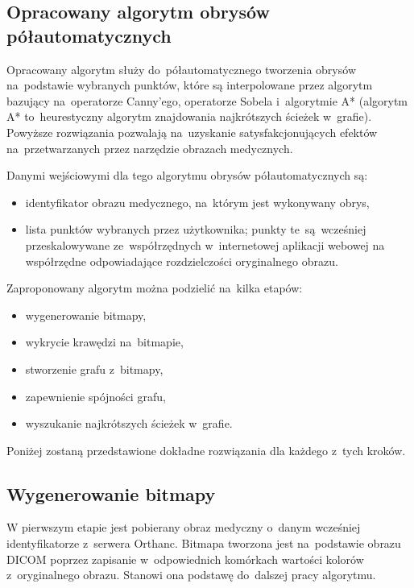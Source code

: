 \documentclass[a4paper,11pt,twoside,openright]{report}
\theoremstyle{definition}
\begin{document}
\subsection {Opracowany algorytm obrysów półautomatycznych}

Opracowany algorytm służy do~półautomatycznego tworzenia obrysów na~podstawie wybranych punktów,
które są interpolowane przez algorytm bazujący na~operatorze Canny'ego, operatorze
Sobela i~algorytmie A* (algorytm A* to~heurestyczny algorytm znajdowania najkrótszych ścieżek w~grafie).
Powyższe rozwiązania pozwalają na~uzyskanie satysfakcjonujących efektów na~przetwarzanych
przez narzędzie obrazach medycznych.

Danymi wejściowymi dla tego algorytmu obrysów półautomatycznych są:
\begin{itemize}[noitemsep]
\item {identyfikator obrazu medycznego, na~którym jest wykonywany obrys,}
\item {lista punktów wybranych przez użytkownika; punkty te~są~wcześniej
przeskalowywane ze~współrzędnych w~internetowej aplikacji webowej
na współrzędne odpowiadające rozdzielczości oryginalnego obrazu.}
\end{itemize}


Zaproponowany algorytm można podzielić na~kilka etapów:

\begin{itemize}[noitemsep]
\item {wygenerowanie bitmapy,}
\item {wykrycie krawędzi na~bitmapie,}
\item {stworzenie grafu z~bitmapy,}
\item {zapewnienie spójności grafu,}
\item {wyszukanie najkrótszych ścieżek w~grafie.}
\end{itemize}

Poniżej zostaną przedstawione dokładne rozwiązania dla każdego z~tych kroków.

\subsection {Wygenerowanie bitmapy}

W pierwszym etapie jest pobierany obraz medyczny o~danym wcześniej
identyfikatorze z~serwera Orthanc. Bitmapa tworzona jest na~podstawie obrazu DICOM poprzez
zapisanie w~odpowiednich komórkach wartości kolorów z~oryginalnego obrazu.
Stanowi ona podstawę do~dalszej pracy algorytmu.
\end{document}
